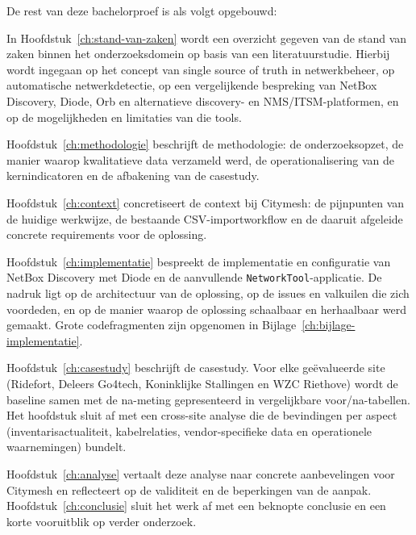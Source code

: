 De rest van deze bachelorproef is als volgt opgebouwd:

In Hoofdstuk~\ref{ch:stand-van-zaken} wordt een overzicht gegeven van de stand van zaken binnen het onderzoeksdomein op basis van een literatuurstudie. Hierbij wordt ingegaan op het concept van single source of truth in netwerkbeheer, op automatische netwerkdetectie, op een vergelijkende bespreking van NetBox Discovery, Diode, Orb en alternatieve discovery- en NMS/ITSM-platformen, en op de mogelijkheden en limitaties van die tools.

Hoofdstuk~\ref{ch:methodologie} beschrijft de methodologie: de onderzoeksopzet, de manier waarop kwalitatieve data verzameld werd, de operationalisering van de kernindicatoren en de afbakening van de casestudy.

Hoofdstuk~\ref{ch:context} concretiseert de context bij Citymesh: de pijnpunten van de huidige werkwijze, de bestaande CSV-import\-workflow en de daaruit afgeleide concrete requirements voor de oplossing.

Hoofdstuk~\ref{ch:implementatie} bespreekt de implementatie en configuratie van NetBox Discovery met Diode en de aanvullende \texttt{NetworkTool}-applicatie. De nadruk ligt op de architectuur van de oplossing, op de issues en valkuilen die zich voordeden, en op de manier waarop de oplossing schaalbaar en herhaalbaar werd gemaakt. Grote codefragmenten zijn opgenomen in Bijlage~\ref{ch:bijlage-implementatie}.

Hoofdstuk~\ref{ch:casestudy} beschrijft de casestudy. Voor elke geëvalueerde site (Ridefort, Deleers Go4tech, Koninklijke Stallingen en WZC Riethove) wordt de baseline samen met de na-meting gepresenteerd in vergelijkbare voor/na-tabellen. Het hoofdstuk sluit af met een cross-site analyse die de bevindingen per aspect (inventarisactualiteit, kabelrelaties, vendor-specifieke data en operationele waarnemingen) bundelt.

Hoofdstuk~\ref{ch:analyse} vertaalt deze analyse naar concrete aanbevelingen voor Citymesh en reflecteert op de validiteit en de beperkingen van de aanpak. Hoofdstuk~\ref{ch:conclusie} sluit het werk af met een beknopte conclusie en een korte vooruitblik op verder onderzoek.

\section{}%
\label{sec:probleemstelling}

